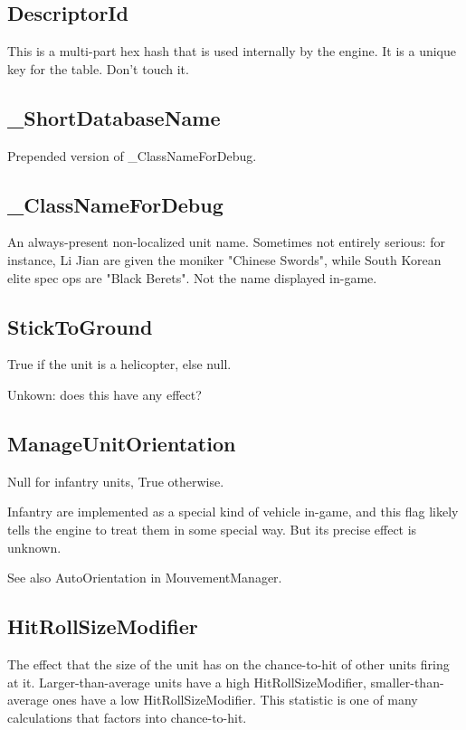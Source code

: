 \documentclass{article}
\begin{document}
\subsection{DescriptorId}

This is a multi-part hex hash that is used internally by the engine. It is a unique key for the table. Don't touch it.

\subsection{\_ShortDatabaseName}

Prepended version of \_ClassNameForDebug.

\subsection{\_ClassNameForDebug}

An always-present non-localized unit name. Sometimes not entirely serious: for instance, Li Jian are given the moniker "Chinese Swords", while South Korean elite spec ops are "Black Berets". Not the name displayed in-game.

\subsection{StickToGround}

True if the unit is a helicopter, else null.

Unkown: does this have any effect?

\subsection{ManageUnitOrientation}

Null for infantry units, True otherwise.

Infantry are implemented as a special kind of vehicle in-game, and this flag likely tells the engine to treat them in some special way. But its precise effect is unknown.

See also AutoOrientation in MouvementManager.

\subsection{HitRollSizeModifier}

The effect that the size of the unit has on the chance-to-hit of other units firing at it. Larger-than-average units have a high HitRollSizeModifier, smaller-than-average ones have a low HitRollSizeModifier. This statistic is one of many calculations that factors into chance-to-hit.
\end{document}
